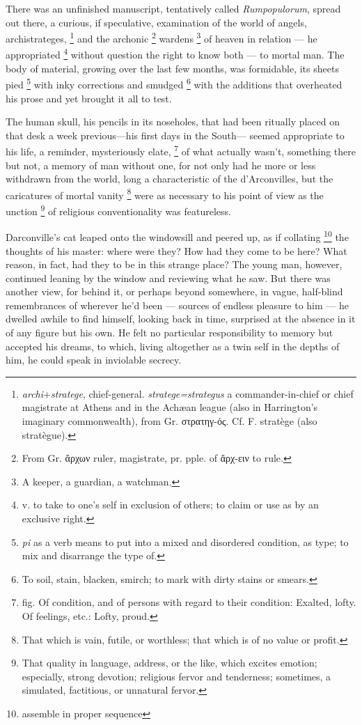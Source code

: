   There was an unfinished manuscript, tentatively called \textit{Rumpopulorum}, 
spread out there, a curious, if speculative, examination of the world of angels,
archistrateges, 
\footnote{\textdbend \textit{archi}+\textit{stratege}, chief-general.
\textit{stratege=strategus} a commander-in-chief or chief magistrate at Athens 
and in the Achæan league (also in Harrington's imaginary commonwealth),
from Gr. στρατηγ-ός. Cf. F. stratège (also stratègue).
}
and the archonic 
\footnote{\textdbend From Gr. ἄρχων ruler, magistrate, pr. pple. of ἄρχ-ειν 
to rule.}
wardens 
\footnote{A keeper, a guardian, a watchman.}
of heaven in relation --- he appropriated
\footnote{v. to take to one's self in exclusion of others; to claim or use as by
an exclusive right.}
without question the right to know both --- to mortal man. The body of material,
growing over the last few months, was formidable, its sheets pied 
\footnote{\textit{pi} as a verb means to put into a mixed and disordered 
condition, as type; to mix and disarrange the type of.}
with inky corrections and smudged 
\footnote{To soil, stain, blacken, smirch; to mark with dirty stains or smears.}
with the additions that overheated his prose and yet
brought it all to test.

  The human skull, his pencils in its noseholes, that had been ritually placed
on that desk a week previous—his first days in the South— seemed appropriate to
his life, a reminder, mysteriously elate, 
\footnote{fig. Of condition, and of persons with regard to their condition:
Exalted, lofty. Of feelings, etc.: Lofty, proud.}
of what actually wasn’t, something
there but not, a memory of man without one, for not only had he more or less
withdrawn from the world, long a characteristic of the d’Arconvilles, but the
caricatures of mortal vanity 
\footnote{That which is vain, futile, or worthless; that which is of no value or
profit.} 
were as necessary to his point of view as the
unction 
\footnote{That quality in language, address, or the like, which excites emotion;
especially, strong devotion; religious fervor and tenderness; sometimes, a
simulated, factitious, or unnatural fervor.
}
of religious conventionality was featureless.

  Darconville’s cat leaped onto the windowsill and peered up, as if collating
\footnote{assemble in proper sequence}
the thoughts of his master: where were they? How had they come to be here? What
reason, in fact, had they to be in this strange place? The young man, however,
continued leaning by the window and reviewing what he saw. But there was another
view, for behind it, or perhaps beyond somewhere, in vague, half-blind
remembrances of wherever he’d been --- sources of endless pleasure to him 
--- he dwelled awhile to find himself, looking back in time, surprised at the 
absence in it of
any figure but his own. He felt no particular responsibility to memory but
accepted his dreams, to which, living altogether as a twin self in the depths of
him, he could speak in inviolable secrecy.

